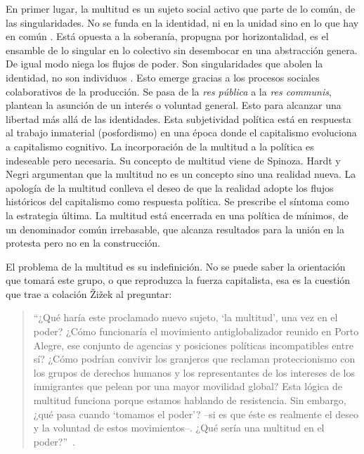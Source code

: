 En primer lugar, la multitud es un sujeto social activo que parte de lo común, de las singularidades. No se funda en la identidad, ni en la unidad sino en lo que hay en común \autocite[p.~128]{straehleDIFICULTADESMULTITUDDISCUSION}. Está opuesta a la soberanía, propugna por horizontalidad, es el ensamble de lo singular en lo colectivo sin desembocar en una abstracción genera. De igual modo niega los flujos de poder. Son singularidades que abolen la identidad, no son individuos \autocite{hardtMultitudGuerraDemocracia2006}. Esto emerge gracias a los procesos sociales colaborativos de la producción. Se pasa de la \emph{res pública} a la \emph{res communis}, plantean la asunción de un interés o voluntad general. Esto para alcanzar una libertad más allá de las identidades. Esta subjetividad política está en respuesta al trabajo inmaterial (posfordismo) en una época donde el capitalismo evoluciona a capitalismo cognitivo. La incorporación de la multitud a la política es indeseable pero necesaria. Su concepto de multitud viene de Spinoza. Hardt y Negri argumentan que la multitud no es un concepto sino una realidad nueva. La apología de la multitud conlleva el deseo de que la realidad adopte los flujos históricos del capitalismo como respuesta política. Se prescribe el síntoma como la estrategia última. La multitud está encerrada en una política de mínimos, de un denominador común irrebasable, que alcanza resultados para la unión en la protesta pero no en la construcción.

El problema de la multitud es su indefinición. No se puede saber la orientación que tomará este grupo, o que reproduzca la fuerza capitalista, esa es la cuestión que trae a colación Žižek al preguntar:

\begin{quote}
  \enquote{¿Qué haría este proclamado nuevo sujeto, \enquote{la multitud}, una vez en el poder? ¿Cómo funcionaría el movimiento antiglobalizador reunido en Porto Alegre, ese conjunto de agencias y posiciones políticas incompatibles entre sí? ¿Cómo podrían convivir los granjeros que reclaman proteccionismo con los grupos de derechos humanos y los representantes de los intereses de los inmigrantes que pelean por una mayor movilidad global? Esta lógica de multitud funciona porque estamos hablando de resistencia. Sin embargo, ¿qué pasa cuando \enquote{tomamos el poder}? --si es que éste es realmente el deseo y la voluntad de estos movimientos--. ¿Qué sería una multitud en el poder?}~\autocite{zizekRevolucionBlanda2004}.
\end{quote}

